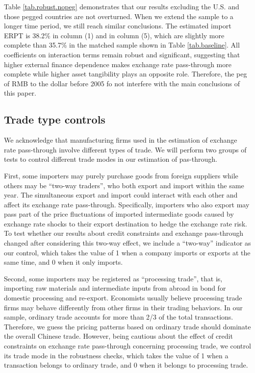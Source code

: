 \documentclass[12pt]{article}
\begin{document}
Table \ref{tab.robust.nopeg} demonstrates that our results excluding the U.S. and those pegged countries are not overturned. When we extend the sample to a longer time period, we still reach similar conclusions. The estimated import ERPT is 38.2\% in column (1) and in column (5), which are slightly more complete than 35.7\% in the matched sample shown in Table \ref{tab.baseline}. All coefficients on interaction terms remain robust and significant, suggesting that higher external finance dependence makes exchange rate pass-through more complete while higher asset tangibility plays an opposite role. Therefore, the peg of RMB to the dollar before 2005 fo not interfere with the main conclusions of this paper.

\subsection{Trade type controls}

We acknowledge that manufacturing firms used in the estimation of exchange rate pass-through involve different types of trade. We will perform two groups of tests to control different trade modes in our estimation of pas-through.

First, some importers may purely purchase goods from foreign suppliers while others may be ``two-way traders'', who both export and import within the same year. The simultaneous export and import could interact with each other and affect its exchange rate pass-through. Specifically, importers who also export may pass part of the price fluctuations of imported intermediate goods caused by exchange rate shocks to their export destination to hedge the exchange rate risk. To test whether our results about credit constraints and exchange pass-through changed after considering this two-way effect, we include a ``two-way'' indicator as our control, which takes the value of 1 when a company imports or exports at the same time, and 0 when it only imports.

Second, some importers may be registered as ``processing trade'', that is, importing raw materials and intermediate inputs from abroad in bond for domestic processing and re-export. Economists usually believe processing trade firms may behave differently from other firms in their trading behaviors. In our sample, ordinary trade accounts for more than 2/3 of the total transactions. Therefore, we guess the pricing patterns based on ordinary trade should dominate the overall Chinese trade. However, being cautious about the effect of credit constraints on exchange rate pass-through concerning processing trade, we control its trade mode in the robustness checks, which takes the value of 1 when a transaction belongs to ordinary trade, and 0 when it belongs to processing trade.
\end{document}
